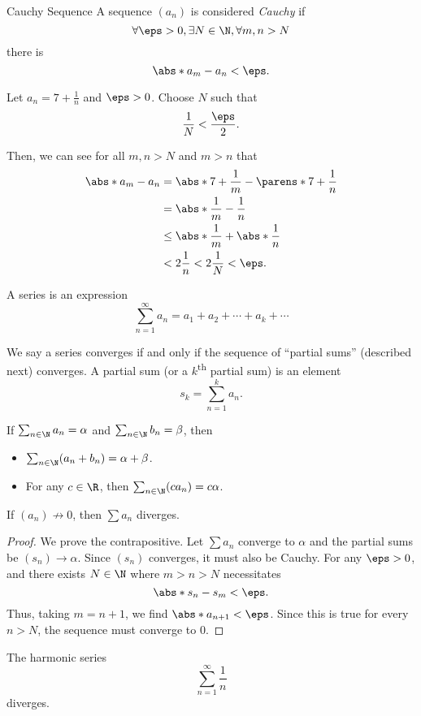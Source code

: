 \documentclass{article}
\begin{document}
\begin{defn}{Cauchy Sequence}{}
  A sequence $(a_{n})$ is considered \emph{Cauchy} if
  \[
    \forall \eps > 0, \exists N \in \N, \forall m,n > N
  \]
  there is
  \[
    \abs*{a_{m} - a_{n}} < \eps.
  \]
\end{defn}

\begin{ex}
  Let $a_{n} = 7 + \frac{1}{n}$ and $\eps > 0$.
  Choose $N$ such that
  \[
    \frac{1}{N} < \frac{\eps}{2}.
  \]

  Then, we can see for all $m, n > N$ and $m > n$ that
  \begin{align*}
    \abs*{a_{m} - a_{n}} &= \abs*{7 + \frac{1}{m} - \parens*{7 + \frac{1}{n}}}\\
    &= \abs*{\frac{1}{m} - \frac{1}{n}}\\
    &\le \abs*{\frac{1}{m}} + \abs*{\frac{1}{n}}\\
    &< 2\frac{1}{n} < 2\frac{1}{N} < \eps.
  \end{align*}
\end{ex}

\begin{defn}[Series]
  A series is an expression
  \[
    \sum_{n = 1}^{\infty}a_{n} = a_{1} + a_{2} + \cdots + a_{k} + \cdots
  \]

  We say a series converges if and only if the sequence of ``partial sums'' (described next) converges.
  A partial sum (or a $k$\textsuperscript{th} partial sum) is an element
  \[
    s_{k} = \sum_{n = 1}^{k}a_{n}.
  \]
\end{defn}
\begin{prop}
  If $\sum_{n \in \N} a_{n} = \alpha$ and $\sum_{n \in \N} b_{n} = \beta$, then
  \begin{itemize}
    \item $\sum_{n \in \N} (a_{n} + b_{n}) = \alpha + \beta$.
    \item For any $c \in \R$, then $\sum_{n \in \N} (ca_{n}) = c\alpha$.
  \end{itemize}
\end{prop}

\begin{prop}
  If $(a_{n}) \not\to 0$, then $\sum a_{n}$ diverges.
  \begin{proof}
    We prove the contrapositive. Let $\sum a_{n}$ converge to $\alpha$ and the partial sums be $(s_{n}) \to \alpha$.
    Since $(s_{n})$ converges, it must also be Cauchy. For any $\eps > 0$, and there exists $N \in \N$ where $m > n > N$
    necessitates
    \[
      \abs*{s_{n} - s_{m}} < \eps.
    \]
    Thus, taking $m = n + 1$, we find $\abs*{a_{n + 1}} < \eps$. Since this is true for every $n > N$, the sequence must converge to 0.
  \end{proof}
\end{prop}
\begin{thm}
  The harmonic series
  \[
  \sum_{n = 1}^{\infty}\frac{1}{n}
  \]
  diverges.
\end{thm}
\end{document}

